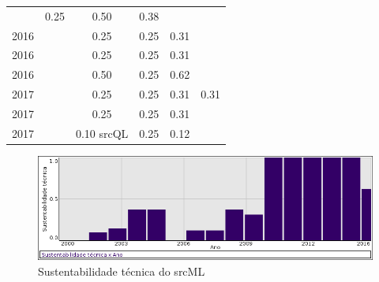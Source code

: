\begin{table}[H]
\begin{tabular}{| l | c | c | c | c | c |}
          &
          0.25
          &
          0.50
          &
          0.38
          &
          \\
            2016
          &
          
          &
          0.25
          &
          0.25
          &
          0.31
          &
          \\
            2016
          &
          
          &
          0.25
          &
          0.25
          &
          0.31
          &
          \\
            2016
          &
          
          &
          0.50
          &
          0.25
          &
          0.62
          &
          \\
\hline
            2017
          &
          
          &
          0.25
          &
          0.25
          &
          0.31
          &
            {\color{red} 0.31}
          \\
            2017
          &
          
          &
          0.25
          &
          0.25
          &
          0.31
          &
          \\
            2017
          &
          
          &
          0.10
            {\tiny srcQL}
          &
          0.25
          &
          0.12
          &
          \\
\hline
\end{tabular}
\end{table}

\begin{figure}[h]
  \center
  \includegraphics[scale=0.50]{imagens/softwares-charts/srcml.png}
  \caption{Sustentabilidade técnica do srcML}
\end{figure}


